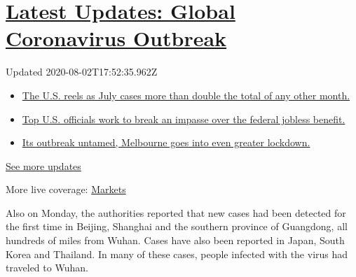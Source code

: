 \hypertarget{latest-updates-global-coronavirus-outbreak}{%
\section{\texorpdfstring{\href{https://www.nytimes.com/2020/08/01/world/coronavirus-covid-19.html?action=click\&pgtype=Article\&state=default\&region=MAIN_CONTENT_1\&context=storylines_live_updates}{Latest
Updates: Global Coronavirus
Outbreak}}{Latest Updates: Global Coronavirus Outbreak}}\label{latest-updates-global-coronavirus-outbreak}}

Updated 2020-08-02T17:52:35.962Z

\begin{itemize}
\tightlist
\item
  \href{https://www.nytimes.com/2020/08/01/world/coronavirus-covid-19.html?action=click\&pgtype=Article\&state=default\&region=MAIN_CONTENT_1\&context=storylines_live_updates\#link-34047410}{The
  U.S. reels as July cases more than double the total of any other
  month.}
\item
  \href{https://www.nytimes.com/2020/08/01/world/coronavirus-covid-19.html?action=click\&pgtype=Article\&state=default\&region=MAIN_CONTENT_1\&context=storylines_live_updates\#link-780ec966}{Top
  U.S. officials work to break an impasse over the federal jobless
  benefit.}
\item
  \href{https://www.nytimes.com/2020/08/01/world/coronavirus-covid-19.html?action=click\&pgtype=Article\&state=default\&region=MAIN_CONTENT_1\&context=storylines_live_updates\#link-2bc8948}{Its
  outbreak untamed, Melbourne goes into even greater lockdown.}
\end{itemize}

\href{https://www.nytimes.com/2020/08/01/world/coronavirus-covid-19.html?action=click\&pgtype=Article\&state=default\&region=MAIN_CONTENT_1\&context=storylines_live_updates}{See
more updates}

More live coverage:
\href{https://www.nytimes.com/live/2020/07/31/business/stock-market-today-coronavirus?action=click\&pgtype=Article\&state=default\&region=MAIN_CONTENT_1\&context=storylines_live_updates}{Markets}

Also on Monday, the authorities reported that new cases had been
detected for the first time in Beijing, Shanghai and the southern
province of Guangdong, all hundreds of miles from Wuhan. Cases have also
been reported in Japan, South Korea and Thailand. In many of these
cases, people infected with the virus had traveled to Wuhan.

